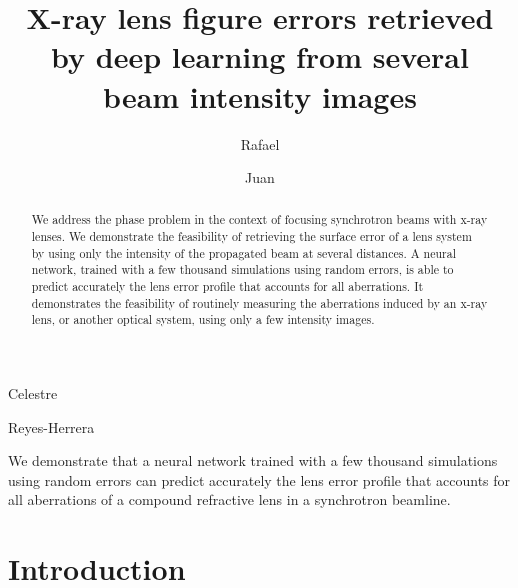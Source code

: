 \documentclass[preprint]{iucr}
\newcommand{\inred}[1]{{\color{red}#1}}
\newcommand{\jsrblue}[1]{\textcolor{JSR_blue}{#1}}
\begin{document}
   

\title{X-ray lens figure errors retrieved by deep learning from several beam intensity images}

\cauthor[a]{\jsrblue{Manuel}}{\jsrblue{Sanchez del Rio}}{srio@esrf.eu}{}

\author[a]{\jsrblue{Rafael}}{\jsrblue{Celestre}}
\author[a]{\jsrblue{Juan}}{\jsrblue{Reyes-Herrera}} 


\maketitle                        %

\begin{synopsis}
We demonstrate that a neural network trained with a few thousand simulations using random errors can predict accurately the lens error profile that accounts for all aberrations of a compound refractive lens in a synchrotron beamline. 
\end{synopsis}

\begin{abstract}
We address the phase problem in the context of focusing synchrotron beams with x-ray lenses. We demonstrate the feasibility of retrieving the surface error of a lens system by using only the intensity of the propagated beam at several distances. A neural network, trained with a few thousand simulations using random errors, is able to predict accurately the lens error profile that accounts for all aberrations. It demonstrates the feasibility of routinely measuring the aberrations induced by an x-ray lens, or another optical system, using only a few \inred{intensity} images. 
\end{abstract}




\section{Introduction}\label{sec:intro}
\end{document}
